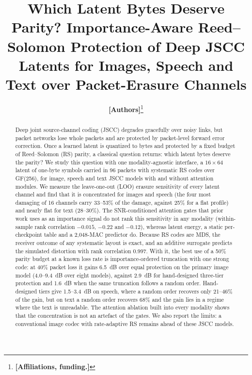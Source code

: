 \documentclass[journal]{IEEEtran}
\providecommand{\TBD}[1]{\textbf{\color{red}[#1]}}
\begin{document}
\title{Which Latent Bytes Deserve Parity? Importance-Aware Reed--Solomon Protection of Deep JSCC
Latents for Images, Speech and Text over Packet-Erasure Channels}
\author{\TBD{Authors}\thanks{\TBD{Affiliations, funding.}}}
\maketitle

\begin{abstract}
Deep joint source-channel coding (JSCC) degrades gracefully over noisy links, but packet networks lose
whole packets and are protected by packet-level forward error correction. Once a learned latent is
quantized to bytes and protected by a fixed budget of Reed--Solomon (RS) parity, a classical question
returns: which latent bytes deserve the parity? We study this question with one modality-agnostic
interface, a $16\times64$ latent of one-byte symbols carried in 96 packets with systematic RS codes over
GF(256), for image, speech and text JSCC models with and without attention modules. We measure the
leave-one-out (LOO) erasure sensitivity of every latent channel and find that it is concentrated for
images and speech (the four most damaging of 16 channels carry 33--53\% of the damage, against 25\% for a
flat profile) and nearly flat for text (28--30\%). The SNR-conditioned attention gates that prior work uses as an importance signal do not
rank this sensitivity in any modality (within-sample rank correlation $-0.015$, $-0.22$ and $-0.12$),
whereas latent energy, a static per-checkpoint table and a 2,048-MAC predictor do. Because RS codes are
MDS, the receiver outcome of any systematic layout is exact, and an additive surrogate predicts the
simulated distortion with rank correlation 0.997. With it, the best use of a 50\% parity budget at a
known loss rate is importance-ordered truncation with one strong code: at 40\% packet loss it gains
6.5~dB over equal protection on the primary image model (4.0--9.4~dB over eight models), against 2.9~dB
for hand-designed three-tier protection and 1.6~dB when the same truncation follows a random order.
Hand-designed tiers give 1.5--3.4~dB on speech, where a random order recovers only 21--46\% of the gain,
but on text a random order recovers 68\% and the gain lies in a regime where the text is unreadable. The
attention ablation built into every modality shows that the concentration is not an artefact of the
gates. We also report the limits: a conventional image codec with rate-adaptive RS remains ahead of
these JSCC models.
\end{abstract}
\end{document}

